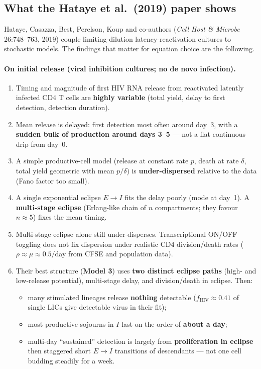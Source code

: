 \documentclass[11pt,a4paper]{article}
\theoremstyle{plain}
\theoremstyle{definition}
\theoremstyle{remark}
\begin{document}
\subsection{What the Hataye et al.\ (2019) paper shows}

Hataye, Casazza, Best, Perelson, Koup and co-authors
(\textit{Cell Host \& Microbe} 26:748--763, 2019) couple limiting-dilution
latency-reactivation cultures to stochastic models. The findings that matter for
equation choice are the following.

\paragraph{On initial release (viral inhibition cultures; no de novo infection).}
\begin{enumerate}
\item Timing and magnitude of first HIV RNA release from reactivated latently
infected CD4 T cells are \textbf{highly variable} (total yield, delay to first
detection, detection duration).
\item Mean release is delayed: first detection most often around day~3, with a
\textbf{sudden bulk of production around days 3--5} --- not a flat continuous drip
from day~0.
\item A simple productive-cell model (release at constant rate $p$, death at rate
$\delta$, total yield geometric with mean $p/\delta$) is
\textbf{under-dispersed} relative to the data (Fano factor too small).
\item A single exponential eclipse $E\to I$ fits the delay poorly (mode at day~1).
A \textbf{multi-stage eclipse} (Erlang-like chain of $n$ compartments; they favour
$n\approx 5$) fixes the mean timing.
\item Multi-stage eclipse alone still under-disperses. Transcriptional
ON/OFF toggling does not fix dispersion under realistic CD4 division/death rates
($\rho\approx\mu\approx 0.5/$day from CFSE and population data).
\item Their best structure (\textbf{Model 3}) uses \textbf{two distinct eclipse
paths} (high- and low-release potential), multi-stage delay, and division/death
in eclipse. Then:
\begin{itemize}
\item many stimulated lineages release \textbf{nothing} detectable
  ($f_{\mathrm{HIV}}\approx 0.41$ of single LICs give detectable virus in their fit);
\item most productive sojourns in $I$ last on the order of \textbf{about a day};
\item multi-day ``sustained'' detection is largely from \textbf{proliferation in
  eclipse} then staggered short $E\to I$ transitions of descendants --- not one
  cell budding steadily for a week.
\end{itemize}
\end{enumerate}
\end{document}
